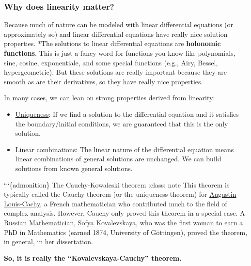 \subsubsection{Why does linearity
matter?}\label{why-does-linearity-matter}

Because much of nature can be modeled with linear differential equations
(or approximately so) and linear differential equations have really nice
solution properties. *The solutions to linear differential equations are
\textbf{holonomic functions}. This is just a fancy word for functions
you know like polynomials, sine, cosine, exponentiale, and some special
functions (e.g., Airy, Bessel, hypergeometric). But these solutions are
really important because they are smooth as are their derivatives, so
they have really nice properties.

In many cases, we can lean on strong properties derived from linearity:

\begin{itemize}
\tightlist
\item
  \href{https://en.wikipedia.org/wiki/Cauchy\%E2\%80\%93Kowalevski_theorem}{Uniqueness}:
  If we find a solution to the differential equation and it satisfies
  the boundary/initial conditions, we are guaranteed that this is the
  only solution.
\item
  Linear combinations: The linear nature of the differential equation
  means linear combinations of general solutions are unchanged. We can
  build solutions from known general solutions.
\end{itemize}

```\{admonition\} The Cauchy-Kowaleski theorem :class: note This theorem
is typically called the Cauchy theorem (or the uniqueness theorem) for
\href{https://en.wikipedia.org/wiki/Augustin-Louis_Cauchy}{Augustin
Louis-Cachy}, a French mathematician who contributed much to the field
of complex analysis. However, Cauchy only proved this theorem in a
special case. A Russian Mathematician,
\href{https://en.wikipedia.org/wiki/Sofya_Kovalevskaya}{Sofya
Kovalevskaya}, who was the first woman to earn a PhD in Mathematics
(earned 1874, University of Göttingen), proved the theorem, in general,
in her dissertation.

\textbf{So, it is really the ``Kovalevskaya-Cauchy'' theorem.}

